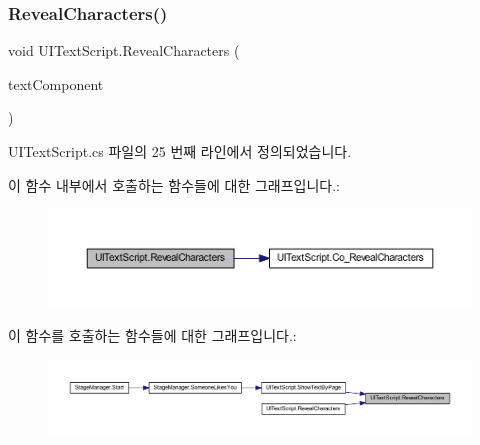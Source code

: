 \subsubsection{\texorpdfstring{RevealCharacters()}{RevealCharacters()}\hspace{0.1cm}{\footnotesize\ttfamily [1/2]}}
{\footnotesize\ttfamily void U\+I\+Text\+Script.\+Reveal\+Characters (\begin{DoxyParamCaption}\item[{T\+M\+P\+\_\+\+Text}]{text\+Component }\end{DoxyParamCaption})}



U\+I\+Text\+Script.\+cs 파일의 25 번째 라인에서 정의되었습니다.


\begin{DoxyCode}{0}

\end{DoxyCode}
이 함수 내부에서 호출하는 함수들에 대한 그래프입니다.\+:\nopagebreak
\begin{figure}[H]
\begin{center}
\leavevmode
\includegraphics[width=350pt]{da/d8d/class_u_i_text_script_adfa2885d1c5654ce0a8da9fe0c5c15f8_cgraph}
\end{center}
\end{figure}
이 함수를 호출하는 함수들에 대한 그래프입니다.\+:\nopagebreak
\begin{figure}[H]
\begin{center}
\leavevmode
\includegraphics[width=350pt]{da/d8d/class_u_i_text_script_adfa2885d1c5654ce0a8da9fe0c5c15f8_icgraph}
\end{center}
\end{figure}
\mbox{\label{class_u_i_text_script_a495e97bbed8219fa703953618f2948b8}} 
